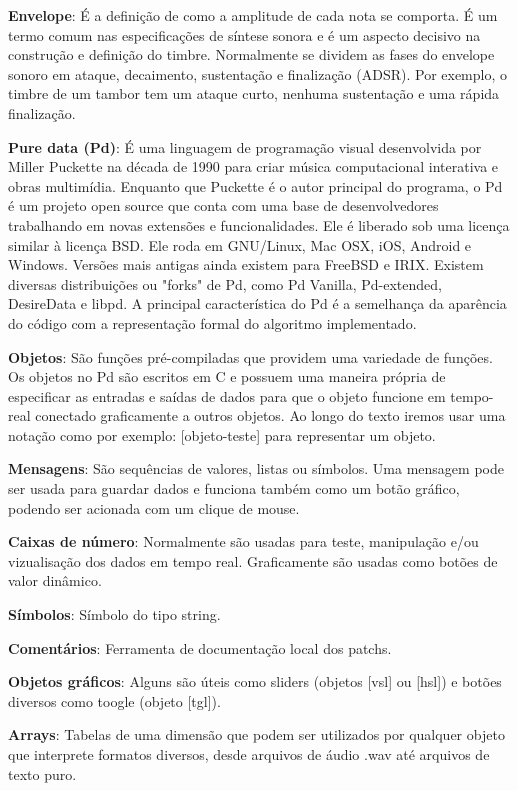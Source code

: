 \documentclass[draft]{ppgmus}
\begin{document}
\textbf{Envelope}: É a definição de como a amplitude de cada nota se comporta.
É um termo comum nas especificações de síntese sonora e é um aspecto decisivo na construção e 
definição do timbre. Normalmente se dividem as fases do
envelope sonoro em ataque, decaimento, sustentação e finalização (ADSR). Por
exemplo, o timbre de um tambor tem um ataque curto, nenhuma sustentação
e uma rápida finalização.

\textbf{Pure data (Pd)}: É uma linguagem de programação visual desenvolvida por Miller Puckette na década de 1990 
para criar música computacional interativa e obras multimídia. Enquanto que Puckette é o autor principal do programa, 
o Pd é um projeto open source que conta com uma base de desenvolvedores trabalhando em novas extensões e funcionalidades.
Ele é liberado sob uma licença similar à licença BSD. Ele roda em GNU/Linux, Mac OSX, iOS, Android e Windows. 
Versões mais antigas ainda existem para FreeBSD e IRIX. Existem diversas distribuições ou "forks" de Pd, como 
Pd Vanilla, Pd-extended, DesireData e libpd. A principal característica do Pd é a semelhança da aparência do código com
a representação formal do algoritmo implementado.


\textbf{Objetos}: São funções pré-compiladas que providem uma variedade de funções.
Os objetos no Pd são escritos em C e possuem uma maneira própria de especificar as entradas e saídas
de dados para que o objeto funcione em tempo-real conectado graficamente a outros objetos.
Ao longo do texto iremos usar uma notação como por exemplo: [objeto-teste] para
representar um objeto.

\textbf{Mensagens}: São sequências de valores, listas ou símbolos. Uma mensagem pode ser usada para
guardar dados e funciona também como um botão gráfico, podendo ser acionada com um clique de mouse.

\textbf{Caixas de número}: Normalmente são usadas para teste, manipulação e/ou vizualisação
dos dados em tempo real. Graficamente são usadas como botões de valor dinâmico.

\textbf{Símbolos}: Símbolo do tipo string.

\textbf{Comentários}: Ferramenta de documentação local dos patchs.

\textbf{Objetos gráficos}: Alguns são úteis como sliders (objetos [vsl] ou [hsl])  e botões diversos como
toogle (objeto [tgl]).

\textbf{Arrays}: Tabelas de uma dimensão que podem ser utilizados por qualquer objeto
que interprete formatos diversos, desde arquivos de áudio .wav até arquivos de 
texto puro.
\end{document}
